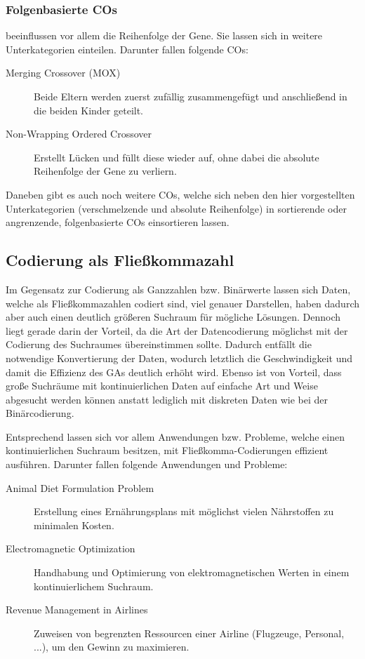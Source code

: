 	\subsubsection{Folgenbasierte COs}
	
		beeinflussen vor allem die Reihenfolge der Gene. Sie lassen sich in weitere Unterkategorien einteilen. Darunter fallen \zB folgende COs:
		
		\begin{description}
			\item[Merging Crossover (MOX)] Beide Eltern werden zuerst zufällig zu\-sam\-men\-ge\-fügt und anschließend in die beiden Kinder geteilt. \cite{OrderBasedForGCP}
			\item[Non-Wrapping Ordered Crossover] Erstellt Lücken und füllt diese wieder auf, ohne dabei die absolute Reihenfolge der Gene zu verliern. \cite{GAforTSP}
		\end{description}
	
		Daneben gibt es auch noch weitere COs, welche sich neben den hier vorgestellten Unterkategorien (verschmelzende und absolute Reihenfolge) \zB in sor\-tier\-ende oder angrenzende, folgenbasierte COs einsortieren lassen.


\subsection{Codierung als Fließkommazahl}
\label{sec:FloatCod}

	Im Gegensatz zur Codierung als Ganzzahlen bzw. Binärwerte lassen sich Daten, welche als Fließkommazahlen codiert sind, viel genauer Darstellen, haben da\-durch aber auch einen deutlich größeren Suchraum für mögliche Lösungen. Dennoch liegt gerade darin der Vorteil, da die Art der Datencodierung möglichst mit der Codierung des Suchraumes übereinstimmen sollte. Dadurch entfällt die notwendige Konvertierung der Daten, wodurch letztlich die Geschwindigkeit und damit die Effizienz des GAs deutlich erhöht wird. Ebenso ist von Vorteil, dass große Suchräume mit kontinuierlichen Daten auf einfache Art und Weise abgesucht werden können anstatt lediglich mit diskreten Daten wie bei der Binärcodierung. \cite{TacklingRealCodedGA}
	
	Entsprechend lassen sich vor allem Anwendungen bzw. Probleme, welche einen kontinuierlichen Suchraum besitzen, mit Fließkomma-Codierungen effizient ausführen. Darunter fallen \zB folgende Anwendungen und Probleme:
	
	\begin{description}
		\item[Animal Diet Formulation Problem] Erstellung eines Ernährungsplans mit möglichst vielen Nährstoffen zu minimalen Kosten. \cite{ConceptOfCOInRealCoded}
		\item[Electromagnetic Optimization] Handhabung und Optimierung von elektromagnetischen Werten in einem kontinuierlichem Suchraum. \cite{ElectromagneticRealEncoding}
		\item[Revenue Management in Airlines] Zuweisen von begrenzten Ressourcen ei\-ner Airline (Flugzeuge, Personal, ...), um den Gewinn zu maximieren. \cite{AirlineRevenueManagement}
	\end{description}
	
